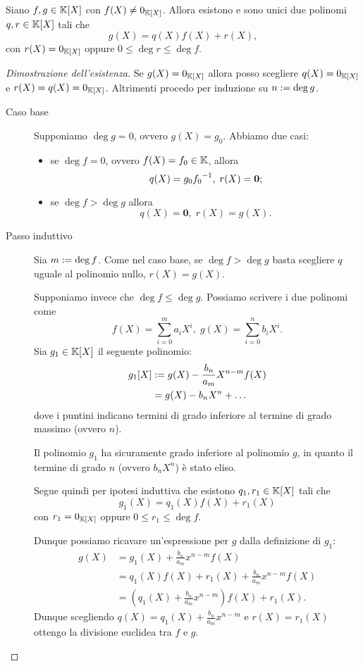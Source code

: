 \begin{theorem}
    Siano $f, g \in \mathbb{K}[X]$ con $f(X) \neq 0_{\mathbb{K}[X]}$. Allora esistono e sono unici due polinomi $q, r \in \mathbb{K}[X]$ tali che \[
        g(X) = q(X)f(X) + r(X),
    \] con $r(X) = 0_{\mathbb{K}[X]}$ oppure $0 \leq \deg r \leq \deg f$.
\end{theorem}
\begin{proof}[Dimostrazione dell'esistenza]
    Se $g(X) = 0_{\mathbb{K}[X]}$ allora posso scegliere $q(X) = 0_{\mathbb{K}[X]}$ e $r(X) = q(X) = 0_{\mathbb{K}[X]}$.
    Altrimenti procedo per induzione su $n := \deg g$.
    \begin{description}
        \item[Caso base] Supponiamo $\deg g = 0$, ovvero $g(X) = g_0$. Abbiamo due casi: \begin{itemize}
            \item se $\deg f = 0$, ovvero $f(X) = f_0 \in \mathbb{K}$, allora \[
                q(X) = g_0{f_0}^{-1}, \; r(X) = \bm 0;
            \]
            \item se $\deg f > \deg g$ allora \[
                q(X) = \bm 0, \; r(X) = g(X).    
            \]
        \end{itemize}
        \item[Passo induttivo] Sia $m := \deg f$. Come nel caso base, se $\deg f > \deg g$ basta scegliere $q$ uguale al polinomio nullo, $r(X) = g(X)$.
        
        Supponiamo invece che $\deg f \leq \deg g$. Possiamo scrivere i due polinomi come \[
            f(X) = \sum_{i = 0}^m a_iX^i, \; g(X) = \sum_{i = 0}^n b_iX^i.    
        \]
        Sia $g_1 \in \mathbb{K}[X]$ il seguente polinomio: \begin{align*}
            g_1[X] &:= g(X) - \frac{b_n}{a_m}X^{n-m}f(X)\\  
            &= g(X) - b_nX^n + \dots 
        \end{align*}
        dove i puntini indicano termini di grado inferiore al termine di grado massimo (ovvero $n$).

        Il polinomio $g_1$ ha sicuramente grado inferiore al polinomio $g$, in quanto il termine di grado $n$ (ovvero $b_nX^n$) è stato eliso.

        Segue quindi per ipotesi induttiva che esistono $q_1, r_1 \in \mathbb{K}[X]$ tali che \[
            g_1(X) = q_1(X)f(X) + r_1(X)    
        \] con $r_1 = 0_{\mathbb{K}[X]}$ oppure $0 \leq r_1 \leq \deg f$.

        Dunque possiamo ricavare un'espressione per $g$ dalla definizione di $g_1$:
        \begin{align*}
            g(X) &= g_1(X) + \frac{b_n}{a_m}x^{n-m}f(X)\\
            &= q_1(X)f(X) + r_1(X) + \frac{b_n}{a_m}x^{n-m}f(X)\\
            &= (q_1(X) + \frac{b_n}{a_m}x^{n-m})f(X) + r_1(X).
        \end{align*}
        Dunque scegliendo $q(X) = q_1(X) + \frac{b_n}{a_m}x^{n-m}$ e $r(X) = r_1(X)$ ottengo la divisione euclidea tra $f$ e $g$.
    \end{description}
\end{proof}
